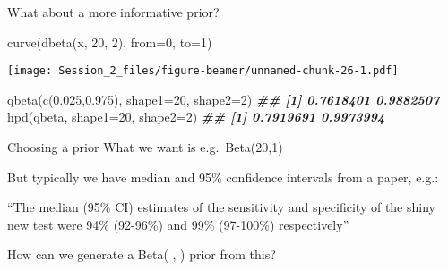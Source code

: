 \documentclass[
  ignorenonframetext,
  aspectratio=169,
]{beamer}
\newenvironment{Shaded}{\begin{snugshade}}{\end{snugshade}}
\newcommand{\AttributeTok}[1]{\textcolor[rgb]{0.77,0.63,0.00}{#1}}
\newcommand{\DecValTok}[1]{\textcolor[rgb]{0.00,0.00,0.81}{#1}}
\newcommand{\DocumentationTok}[1]{\textcolor[rgb]{0.56,0.35,0.01}{\textbf{\textit{#1}}}}
\newcommand{\FloatTok}[1]{\textcolor[rgb]{0.00,0.00,0.81}{#1}}
\newcommand{\FunctionTok}[1]{\textcolor[rgb]{0.00,0.00,0.00}{#1}}
\newcommand{\NormalTok}[1]{#1}
\begin{document}
\begin{frame}[fragile]
What about a more informative prior?

\scriptsize

\begin{Shaded}
\begin{Highlighting}[]
\FunctionTok{curve}\NormalTok{(}\FunctionTok{dbeta}\NormalTok{(x, }\DecValTok{20}\NormalTok{, }\DecValTok{2}\NormalTok{), }\AttributeTok{from=}\DecValTok{0}\NormalTok{, }\AttributeTok{to=}\DecValTok{1}\NormalTok{)}
\end{Highlighting}
\end{Shaded}

\texttt{[image: Session\_2\_files/figure-beamer/unnamed-chunk-26-1.pdf]}

\begin{Shaded}
\begin{Highlighting}[]
\FunctionTok{qbeta}\NormalTok{(}\FunctionTok{c}\NormalTok{(}\FloatTok{0.025}\NormalTok{,}\FloatTok{0.975}\NormalTok{), }\AttributeTok{shape1=}\DecValTok{20}\NormalTok{, }\AttributeTok{shape2=}\DecValTok{2}\NormalTok{)}
\DocumentationTok{\#\# [1] 0.7618401 0.9882507}
\FunctionTok{hpd}\NormalTok{(qbeta, }\AttributeTok{shape1=}\DecValTok{20}\NormalTok{, }\AttributeTok{shape2=}\DecValTok{2}\NormalTok{)}
\DocumentationTok{\#\# [1] 0.7919691 0.9973994}
\end{Highlighting}
\end{Shaded}

\normalsize
\end{frame}

\begin{frame}{Choosing a prior}
\protect\hypertarget{choosing-a-prior}{}
What we want is e.g.~Beta(20,1)

But typically we have median and 95\% confidence intervals from a paper,
e.g.:

``The median (95\% CI) estimates of the sensitivity and specificity of
the shiny new test were 94\% (92-96\%) and 99\% (97-100\%)
respectively''

\pause

How can we generate a Beta( , ) prior from this?
\end{frame}
\end{document}
